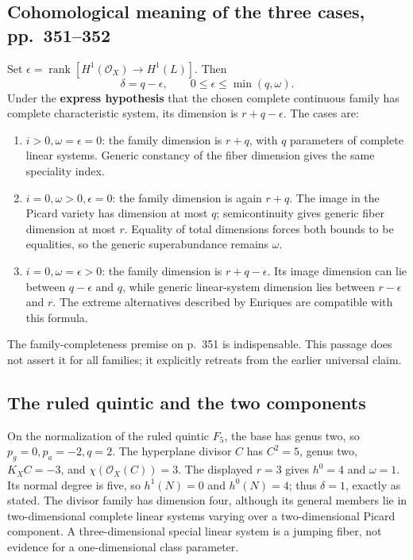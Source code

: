\subsection{Cohomological meaning of the three cases, pp.~351--352}\label{cp2-ix-7-3}

Set \(\epsilon=\operatorname{rank}[H^1(\mathcal O_X)\to H^1(L)]\). Then
\[
\delta=q-\epsilon,\qquad 0\leq\epsilon\leq\min(q,\omega).
\]
Under the \textbf{express hypothesis} that the chosen complete continuous family has complete characteristic system, its dimension is \(r+q-\epsilon\). The cases are:

\begin{enumerate}
\item \(i>0,\omega=\epsilon=0\): the family dimension is \(r+q\), with \(q\) parameters of complete linear systems. Generic constancy of the fiber dimension gives the same speciality index.
\item \(i=0,\omega>0,\epsilon=0\): the family dimension is again \(r+q\). The image in the Picard variety has dimension at most \(q\); semicontinuity gives generic fiber dimension at most \(r\). Equality of total dimensions forces both bounds to be equalities, so the generic superabundance remains \(\omega\).
\item \(i=0,\omega=\epsilon>0\): the family dimension is \(r+q-\epsilon\). Its image dimension can lie between \(q-\epsilon\) and \(q\), while generic linear-system dimension lies between \(r-\epsilon\) and \(r\). The extreme alternatives described by Enriques are compatible with this formula.

\end{enumerate}
The family-completeness premise on p.~351 is indispensable. This passage does not assert it for all families; it explicitly retreats from the earlier universal claim.

\subsection{The ruled quintic and the two components}\label{cp2-ix-7-4}

On the normalization of the ruled quintic \(F_5\), the base has genus two, so \(p_g=0,p_a=-2,q=2\). The hyperplane divisor \(C\) has \(C^2=5\), genus two, \(K_XC=-3\), and \(\chi(\mathcal O_X(C))=3\). The displayed \(r=3\) gives \(h^0=4\) and \(\omega=1\). Its normal degree is five, so \(h^1(N)=0\) and \(h^0(N)=4\); thus \(\delta=1\), exactly as stated. The divisor family has dimension four, although its general members lie in two-dimensional complete linear systems varying over a two-dimensional Picard component. A three-dimensional special linear system is a jumping fiber, not evidence for a one-dimensional class parameter.

